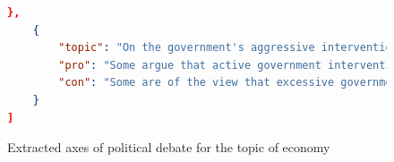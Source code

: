 \documentclass[final,5p,times,twocolumn,authoryear]{elsarticle}
\begin{document}
\begin{figure}[h]
\begin{lstlisting}[language=json,firstnumber=1]
    },
    {
        "topic": "On the government's aggressive intervention in the economy", {
        "pro": "Some argue that active government intervention is necessary for economic growth, the development of new industries, and regional development, especially efficient administrative and policy support." ,.
        "con": "Some are of the view that excessive government intervention will stifle free competition in the market and create unnecessary regulations. There also exists the opinion that government intervention should be prudent because it may affect the vitality and autonomy of the private sector."
    }
]
\end{lstlisting}

\caption{Extracted axes of political debate for the topic of economy}
\label{fig: extracted axes economy}
\end{figure}
\end{document}
